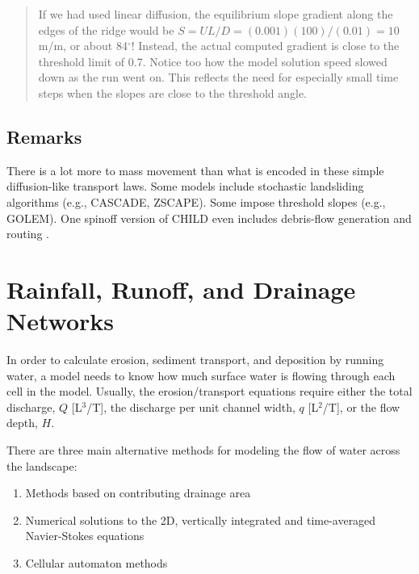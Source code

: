 \documentclass[12pt,reqno]{amsart}
\begin{document}
\begin{quote}
\small
{\sf
{}
If we had used linear diffusion, the equilibrium slope gradient along the edges of the ridge would be $S = UL/D = (0.001)(100)/(0.01) = 10$ m/m, or about 84$^\circ$! Instead, the actual computed gradient is close to the threshold limit of 0.7. Notice too how the model solution speed slowed down as the run went on. This reflects the need for especially small time steps when the slopes are close to the threshold angle.
}
\end{quote}

\subsection{Remarks}

There is a lot more to mass movement than what is encoded in these simple diffusion-like transport laws. Some models include stochastic landsliding algorithms (e.g., CASCADE, ZSCAPE). Some impose threshold slopes (e.g., GOLEM). One spinoff version of CHILD even includes debris-flow generation and routing \citep{lancaster2003effects}.

\section{Rainfall, Runoff, and Drainage Networks}

In order to calculate erosion, sediment transport, and deposition by running water, a model needs to know how much surface water is flowing through each cell in the model. Usually, the erosion/transport equations require either the total discharge, $Q$ [L$^3$/T], the discharge per unit channel width, $q$ [L$^2$/T], or the flow depth, $H$.

There are three main alternative methods for modeling the flow of water across the landscape:
\begin{enumerate}
\item Methods based on contributing drainage area
\item Numerical solutions to the 2D, vertically integrated and time-averaged Navier-Stokes equations
\item Cellular automaton methods
\end{enumerate}
\end{document}
